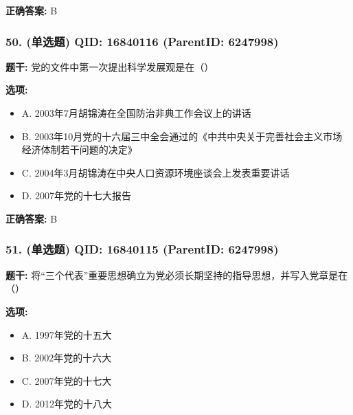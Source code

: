 \documentclass[12pt,UTF8]{ctexart}
\begin{document}
\textbf{正确答案:}
B

\vspace{0.3em}\hrulefill\vspace{0.7em}

\subsubsection*{50. (单选题) \small QID: 16840116 (ParentID: 6247998)}

\textbf{题干:}
党的文件中第一次提出科学发展观是在（）



\textbf{选项:}
\begin{itemize}[leftmargin=*]

  \item A. 2003年7月胡锦涛在全国防治非典工作会议上的讲话

  \item B. 2003年10月党的十六届三中全会通过的《中共中央关于完善社会主义市场经济体制若干问题的决定》

  \item C. 2004年3月胡锦涛在中央人口资源环境座谈会上发表重要讲话

  \item D. 2007年党的十七大报告

\end{itemize}

\textbf{正确答案:}
B

\vspace{0.3em}\hrulefill\vspace{0.7em}

\subsubsection*{51. (单选题) \small QID: 16840115 (ParentID: 6247998)}

\textbf{题干:}
将“三个代表”重要思想确立为党必须长期坚持的指导思想，并写入党章是在（）



\textbf{选项:}
\begin{itemize}[leftmargin=*]

  \item A. 1997年党的十五大

  \item B. 2002年党的十六大

  \item C. 2007年党的十七大

  \item D. 2012年党的十八大

\end{itemize}
\end{document}

